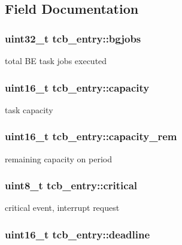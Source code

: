 \subsection{Field Documentation}
\hypertarget{structtcb__entry_a27631962295edabd283477b471f2d7ae}{
\subsubsection[{bgjobs}]{\setlength{\rightskip}{0pt plus 5cm}uint32\-\_\-t tcb\-\_\-entry\-::bgjobs}}\label{structtcb__entry_a27631962295edabd283477b471f2d7ae}
total B\-E task jobs executed \hypertarget{structtcb__entry_a2a3c8e5e81c910ccd845a8d1f58d550a}{
\subsubsection[{capacity}]{\setlength{\rightskip}{0pt plus 5cm}uint16\-\_\-t tcb\-\_\-entry\-::capacity}}\label{structtcb__entry_a2a3c8e5e81c910ccd845a8d1f58d550a}
task capacity \hypertarget{structtcb__entry_a559dce8ac2982d3c8f46808ddc52bbb9}{
\subsubsection[{capacity\-\_\-rem}]{\setlength{\rightskip}{0pt plus 5cm}uint16\-\_\-t tcb\-\_\-entry\-::capacity\-\_\-rem}}\label{structtcb__entry_a559dce8ac2982d3c8f46808ddc52bbb9}
remaining capacity on period \hypertarget{structtcb__entry_ab76fc52c033f2b9cd0adc9474fcde5ef}{
\subsubsection[{critical}]{\setlength{\rightskip}{0pt plus 5cm}uint8\-\_\-t tcb\-\_\-entry\-::critical}}\label{structtcb__entry_ab76fc52c033f2b9cd0adc9474fcde5ef}
critical event, interrupt request \hypertarget{structtcb__entry_a14ef4f38d7589e42ac7847b2bcc3443f}{
\subsubsection[{deadline}]{\setlength{\rightskip}{0pt plus 5cm}uint16\-\_\-t tcb\-\_\-entry\-::deadline}}\label{structtcb__entry_a14ef4f38d7589e42ac7847b2bcc3443f}

